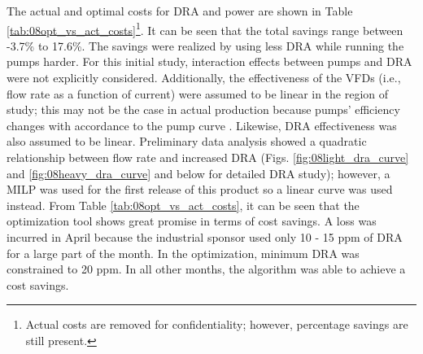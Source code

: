The actual and optimal costs for DRA and power are shown in Table \ref{tab:08opt_vs_act_costs}\footnote{Actual costs are removed for confidentiality; however, percentage savings are still present.}.  It can be seen that the total savings range between -3.7\% to 17.6\%.  The savings were realized by using less DRA while running the pumps harder. For this initial study, interaction effects between pumps and DRA were not explicitly considered. Additionally, the effectiveness of the VFDs (i.e., flow rate as a function of current) were assumed to be linear in the region of study; this may not be the case in actual production because pumps' efficiency changes with accordance to the pump curve \cite{fluid_mechanics}. Likewise, DRA effectiveness was also assumed to be linear. Preliminary data analysis showed a quadratic relationship between flow rate and increased DRA (Figs. \ref{fig:08light_dra_curve} and \ref{fig:08heavy_dra_curve} and below for detailed DRA study); however, a MILP was used for the first release of this product so a linear curve was used instead. From Table \ref{tab:08opt_vs_act_costs}, it can be seen that the optimization tool shows great promise in terms of cost savings. A loss was incurred in April because the industrial sponsor used only 10 - 15 ppm of DRA for a large part of the month. In the optimization, minimum DRA was constrained to 20 ppm. In all other months, the algorithm was able to achieve a cost savings.

